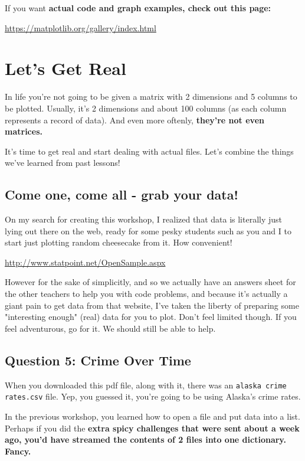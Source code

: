 \documentclass{article}
\begin{document}
    If you want \bfseries actual \mdseries code and graph examples, check out this page:

    \url{https://matplotlib.org/gallery/index.html}

    \section{Let's Get Real}
    In life you're not going to be given a matrix with 2 dimensions and 5 columns to be plotted. Usually, it's 2 dimensions and about 100 columns (as each column represents a record of data). And even more oftenly, \bfseries they're not even matrices. \mdseries

    It's time to get real and start dealing with actual files. Let's combine the things we've learned from past lessons!

    \subsection{Come one, come all - grab your data!}
    On my search for creating this workshop, I realized that data is literally just lying out there on the web, ready for some pesky students such as you and I to start just plotting random cheesecake from it. How convenient!

    \url{http://www.statpoint.net/OpenSample.aspx}

    However for the sake of simplicitly, and so we actually have an answers sheet for the other teachers to help you with code problems, and because it's actually a giant pain to get data from that website, I've taken the liberty of preparing some "interesting enough" (real) data for you to plot. Don't feel limited though. If you feel adventurous, go for it. We should still be able to help.

    \subsection{Question 5: Crime Over Time}
    When you downloaded this pdf file, along with it, there was an \texttt{alaska crime rates.csv} file. Yep, you guessed it, you're going to be using Alaska's crime rates.

    In the previous workshop, you learned how to open a file and put data into a list. Perhaps if you did the \bfseries extra spicy challenges \mdseries that were sent about a week ago, you'd have streamed the contents of 2 files into one dictionary. Fancy.
\end{document}
